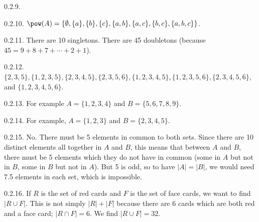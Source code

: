 \begin {itemize}
\begin{ans}{0.2.9.}
\end{ans}
\begin{ans}{0.2.10.}
    $\pow(A) = \{\emptyset, \{a\}, \{b\}, \{c\}, \{a,b\}, \{a,c\}, \{b,c\}, \{a,b,c\}\}$.
  
\end{ans}
\begin{ans}{0.2.11.}
      There are 10 singletons.  There are 45 doubletons (because $45 = 9+8+7+\cdots+2+1$).
  
\end{ans}
\begin{ans}{0.2.12.}
      $\{2,3,5\}, \{1,2,3,5\}, \{2,3,4,5\}, \{2,3,5,6\}, \{1,2,3,4,5\}, \{1,2,3,5,6\}, \{2,3,4,5,6\}$, and $\{1,2,3,4,5,6\}$.
  
\end{ans}
\begin{ans}{0.2.13.}
   For example $A = \{1,2,3,4\}$ and $B = \{5,6,7,8,9\}$.
  
\end{ans}
\begin{ans}{0.2.14.}
    For example, $A = \{1,2,3\}$ and $B = \{2,3,4,5\}$.
  
\end{ans}
\begin{ans}{0.2.15.}
	 No.  There must be 5 elements in common to both sets.  Since there are 10 distinct elements all together in $A$ and $B$, this means that between $A$ and $B$, there must be 5 elements which they do not have in common (some in $A$ but not in $B$, some in $B$ but not in $A$).  But 5 is odd, so to have $|A| = |B|$, we would need 7.5 elements in each set, which is impossible.
	
\end{ans}
\begin{ans}{0.2.16.}
      If $R$ is the set of red cards and $F$ is the set of face cards, we want to find $|R \cup F|$.  This is not simply $|R| + |F|$ because there are 6 cards which are both red and a face card; $|R \cap F| = 6$.  We find $|R \cup F| = 32$.
  
\end{ans}
\protect \end {itemize}
